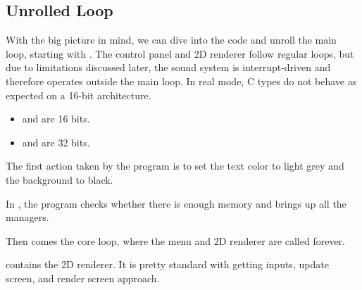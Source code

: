\documentclass[book.tex]{subfiles}
\begin{document}
\subsection{Unrolled Loop}
With the big picture in mind, we can dive into the code and unroll the main loop, starting with . The control panel and 2D renderer follow regular loops, but due to limitations discussed later, the sound system is interrupt-driven and therefore operates outside the main loop. In real mode, C types do not behave as expected on a 16-bit architecture.
\begin{itemize}
\item {} and  are 16 bits.
\item {} and  are 32 bits.
\end{itemize}
\par
The first action taken by the program is to set the text color to light grey and the background to black. \\
\par
\begin{minipage}{\textwidth}

\end{minipage}
\par

\par
In , the program checks whether there is enough memory and brings up all the managers.\\
\par
\begin{minipage}{\textwidth}

\end{minipage}
\par
Then comes the core loop, where the menu and 2D renderer are called forever.

\begin{minipage}{\textwidth}

\end{minipage}
\par
{} contains the 2D renderer. It is pretty standard with getting inputs, update screen, and render screen approach.\\
\par
\begin{minipage}{\textwidth}

\end{minipage} \\
\par
 
\end{document}
